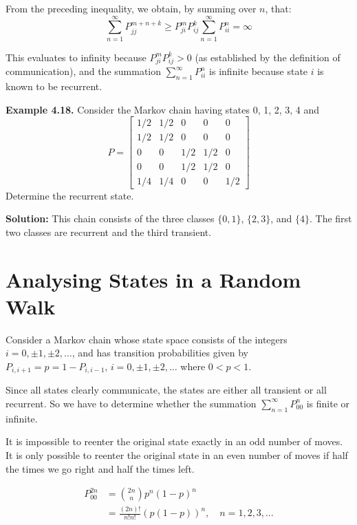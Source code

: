 \documentclass[12pt,a4paper]{article}
\begin{document}
From the preceding inequality, we obtain, by summing over $n$, that:
\[ \sum_{n=1}^\infty P_{jj}^{m+n+k} \ge P_{ji}^m P_{ij}^k \sum_{n=1}^\infty P_{ii}^n = \infty \]

This evaluates to infinity because $P_{ji}^m P_{ij}^k > 0$ (as established by the definition of communication), and the summation $\sum_{n=1}^\infty P_{ii}^n$ is infinite because state $i$ is known to be recurrent.

\vspace{0.5cm}

\textbf{Example 4.18.} Consider the Markov chain having states 0, 1, 2, 3, 4 and
\[ P = \begin{bmatrix} 
1/2 & 1/2 & 0 & 0 & 0 \\ 
1/2 & 1/2 & 0 & 0 & 0 \\ 
0 & 0 & 1/2 & 1/2 & 0 \\ 
0 & 0 & 1/2 & 1/2 & 0 \\ 
1/4 & 1/4 & 0 & 0 & 1/2 
\end{bmatrix} \]
Determine the recurrent state.

\textbf{Solution:} This chain consists of the three classes $\{0, 1\}$, $\{2, 3\}$, and $\{4\}$. The first two classes are recurrent and the third transient.

\vspace{0.5cm}
\section*{\textcolor{secondary}{Analysing States in a Random Walk}}

Consider a Markov chain whose state space consists of the integers $i = 0, \pm 1, \pm 2, \dots$, and has transition probabilities given by $P_{i,i+1} = p = 1 - P_{i,i-1}, \, i = 0, \pm 1, \pm 2, \dots$ where $0 < p < 1$.

Since all states clearly communicate, the states are either all transient or all recurrent. So we have to determine whether the summation $\sum_{n=1}^\infty P_{00}^n$ is finite or infinite.

It is impossible to reenter the original state exactly in an odd number of moves. It is only possible to reenter the original state in an even number of moves if half the times we go right and half the times left.

\begin{align*}
    P_{00}^{2n} &= \binom{2n}{n} p^n (1-p)^n \\
    &= \frac{(2n)!}{n!n!} (p(1-p))^n, \quad n = 1, 2, 3, \dots
\end{align*}
\end{document}
